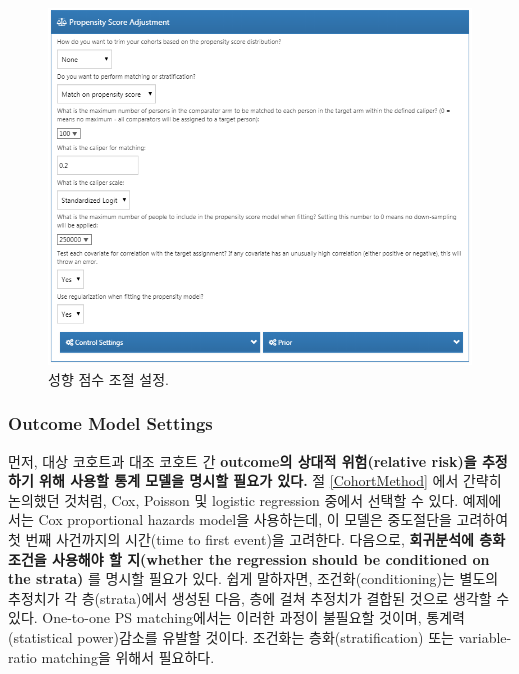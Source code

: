 \documentclass[11pt]{book}
\theoremstyle{definition}
\theoremstyle{definition}
\theoremstyle{definition}
\theoremstyle{remark}
\begin{document}
\begin{figure}

{\centering \includegraphics[width=1\linewidth]{images/PopulationLevelEstimation/psSettings} 

}

\caption{성향 점수 조절 설정.}\label{fig:psSettings}
\end{figure}

\subsubsection*{Outcome Model Settings}\label{outcome-model-settings}

먼저, 대상 코호트과 대조 코호트 간 \textbf{outcome의 상대적
위험(relative risk)을 추정하기 위해 사용할 통계 모델을 명시할 필요가
있다.} 절 \ref{CohortMethod} 에서 간략히 논의했던 것처럼, Cox, Poisson
및 logistic regression 중에서 선택할 수 있다. 예제에서는 Cox
proportional hazards model을 사용하는데, 이 모델은 중도절단을 고려하여
첫 번째 사건까지의 시간(time to first event)을 고려한다. 다음으로,
\textbf{회귀분석에 층화 조건을 사용해야 할 지(whether the regression
should be conditioned on the strata)} 를 명시할 필요가 있다. 쉽게
말하자면, 조건화(conditioning)는 별도의 추정치가 각 층(strata)에서
생성된 다음, 층에 걸쳐 추정치가 결합된 것으로 생각할 수 있다. One-to-one
PS matching에서는 이러한 과정이 불필요할 것이며, 통계력(statistical
power)감소를 유발할 것이다. 조건화는 층화(stratification) 또는
variable-ratio matching을 위해서 필요하다. 
\end{document}
